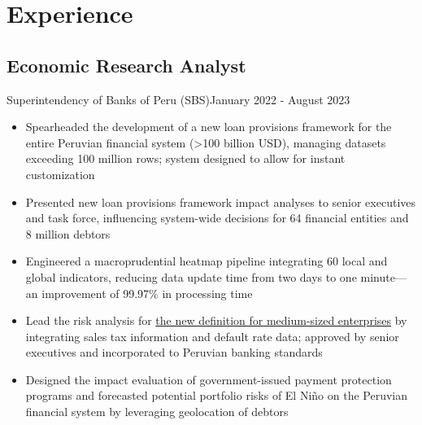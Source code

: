 \section{Experience}
\subsection{Economic Research Analyst}{Superintendency of Banks of Peru (SBS)}{January 2022 - August 2023}
\vspace{0.1cm}
\begin{itemize}
    \item Spearheaded the development of a new loan provisions framework for the entire Peruvian financial system (>100 billion USD), managing datasets exceeding 100 million rows; system designed to allow for instant customization
    \item Presented new loan provisions framework impact analyses to senior executives and task force, influencing system-wide decisions for 64 financial entities and 8 million debtors
    \item Engineered a macroprudential heatmap pipeline integrating 60 local and global indicators, reducing data update time from two days to one minute—an improvement of 99.97\% in processing time
    \item Lead the risk analysis for \href{https://www.sbs.gob.pe/noticia/detallenoticia/idnoticia/2680}{the new definition for medium-sized enterprises} by integrating sales tax information and default rate data; approved by senior executives and incorporated to Peruvian banking standards
    \item Designed the impact evaluation of government-issued payment protection programs and forecasted potential portfolio risks of El Niño on the Peruvian financial system by leveraging geolocation of debtors

\end{itemize}
\vspace{0.1cm}
